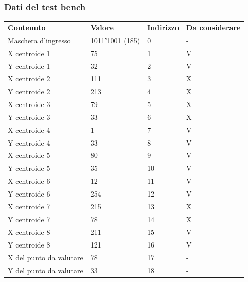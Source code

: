 \documentclass{article}
\begin{document}
\subsubsection{Dati del test bench}
\begin{table}[H]
    \begin{tabu} to 0.8\textwidth { X[1.7l] X[1.1c] X[0.7c] X[1.1c]}
        \textbf{Contenuto} & \textbf{Valore} & \textbf{Indirizzo} & \textbf{Da considerare} \\
         Maschera d'ingresso & 1011'1001 (185) & 0 & - \\
         X centroide 1 & 75 & 1 & V \\
         Y centroide 1 & 32 & 2 & V \\
         X centroide 2 & 111 & 3 & X \\
         Y centroide 2 & 213 & 4 & X \\
         X centroide 3 & 79 & 5 & X \\
         Y centroide 3 & 33 & 6 & X \\
         X centroide 4 & 1 & 7 & V \\
         Y centroide 4 & 33 & 8 & V \\
         X centroide 5 & 80 & 9 & V \\
         Y centroide 5 & 35 & 10 & V \\
         X centroide 6 & 12 & 11 & V \\
         Y centroide 6 & 254 & 12 & V \\
         X centroide 7 & 215 & 13 & X \\
         Y centroide 7 & 78 & 14 & X \\
         X centroide 8 & 211 & 15 & V \\
         Y centroide 8 & 121 & 16 & V \\
         X del punto da valutare & 78 & 17 & - \\
         Y del punto da valutare & 33 & 18 & - \\
    \end{tabu}
\end{table}
\end{document}
